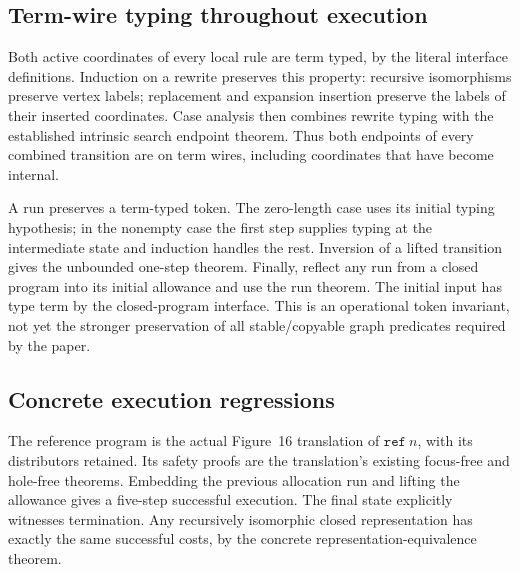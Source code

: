 

\subsection{Term-wire typing throughout execution}

Both active coordinates of every local rule are term typed, by the
literal interface definitions. Induction on a rewrite preserves this
property: recursive isomorphisms preserve vertex labels; replacement and
expansion insertion preserve the labels of their inserted coordinates.
Case analysis then combines rewrite typing with the established intrinsic
search endpoint theorem. Thus both endpoints of every combined transition
are on term wires, including coordinates that have become internal.




A run preserves a term-typed token. The zero-length case uses its
initial typing hypothesis; in the nonempty case the first step supplies
typing at the intermediate state and induction handles the rest. Inversion
of a lifted transition gives the unbounded one-step theorem. Finally, reflect
any run from a closed program into its initial allowance and use the run
theorem. The initial input has type term by the closed-program interface.
This is an operational token invariant, not yet the stronger preservation
of all stable/copyable graph predicates required by the paper.




\subsection{Concrete execution regressions}

The reference program is the actual Figure~16 translation of
$\mathtt{ref}\ n$, with its distributors retained. Its safety proofs are the
translation's existing focus-free and hole-free theorems. Embedding the
previous allocation run and lifting the allowance gives a five-step
successful execution. The final state explicitly witnesses termination.
Any recursively isomorphic closed representation has exactly the same
successful costs, by the concrete representation-equivalence theorem.

